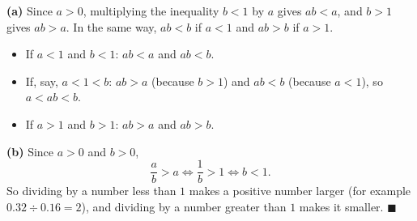 \textbf{(a)} Since $a>0$, multiplying the inequality $b<1$ by $a$ gives $ab<a$, and $b>1$ gives $ab>a$. In the same way, $ab<b$ if $a<1$ and $ab>b$ if $a>1$.
\begin{itemize}
\item If $a<1$ and $b<1$: $ab<a$ and $ab<b$.
\item If, say, $a<1<b$: $ab>a$ (because $b>1$) and $ab<b$ (because $a<1$), so $a<ab<b$.
\item If $a>1$ and $b>1$: $ab>a$ and $ab>b$.
\end{itemize}

\textbf{(b)} Since $a>0$ and $b>0$,
\[\dfrac ab>a\iff\dfrac1b>1\iff b<1.\]
So dividing by a number less than $1$ makes a positive number larger (for example $0.32\div0.16=2$), and dividing by a number greater than $1$ makes it smaller. $\blacksquare$
